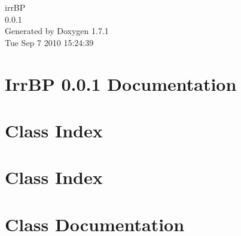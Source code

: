 \documentclass[a4paper]{book}
\begin{document}
\hypersetup{pageanchor=false}
\begin{titlepage}
\vspace*{7cm}
\begin{center}
{\Large irrBP \\[1ex]\large 0.0.1 }\\
\vspace*{1cm}
{\large Generated by Doxygen 1.7.1}\\
\vspace*{0.5cm}
{\small Tue Sep 7 2010 15:24:39}\\
\end{center}
\end{titlepage}
\clearemptydoublepage
{}
\tableofcontents
\clearemptydoublepage
{}
\hypersetup{pageanchor=true}
\chapter{IrrBP 0.0.1 Documentation}
\label{index}\hypertarget{index}{}
\chapter{Class Index}

\chapter{Class Index}

\chapter{Class Documentation}























\printindex
\end{document}
